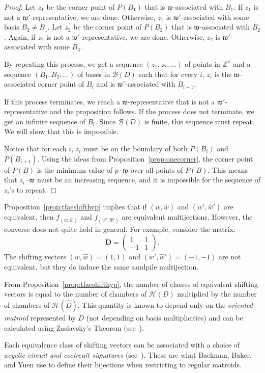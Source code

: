 \documentclass[ALCO,ThmDefs,Unicode,epreuves]{cedram}
\newcommand{\Z}{\mathbb{Z}}
\newcommand{\D}{\mathbf{D}}
\newcommand{\B}{\mathcal{B}}
\newcommand{\w}{\mathfrak w}
\begin{document}
\begin{proof}
Let $z_1$ be the corner point of $P(B_1)$ that is $\w$-associated with $B_1$. If $z_1$ is not a $\w'$-representative, we are done. Otherwise, $z_1$ is $\w'$-associated with some basis $B_2 \not= B_1$. Let $z_2$ be the corner point of $P(B_2)$ that is $\w$-associated with $B_2$. Again, if $z_2$ is not a $\w'$-representative, we are done. Otherwise, $z_2$ is $\w'$-associated with some $B_3$. 

By repeating this process, we get a sequence $(z_1,z_2,\dots)$ of points in $\Z^n$ and a sequence $(B_1,B_2,\dots)$ of bases in $\B(D)$ such that for every $i$, $z_i$ is the $\w$-associated corner point of $B_i$ and is $\w'$-associated with $B_{i+1}$. 

If this process terminates, we reach a $\w$-representative that is not a $\w'$-representative and the proposition follows. If the process does not terminate, we get an infinite sequence of $B_i$. Since $\B(D)$ is finite, this sequence must repeat. We will show that this is impossible.

Notice that for each $i$, $z_i$ must be on the boundary of both $P(B_i)$ and $P(B_{i+1})$. Using the ideas from Proposition~\ref{prop:onecorner}, the corner point of $P(B)$ is the minimum value of $p \cdot \w$ over all points of $P(B)$. This means that $z_i \cdot \w$ must be an increasing sequence, and it is impossible for the sequence of $z_i$'s to repeat. 
\end{proof}

Proposition~\ref{prop:tfaeshifthyp} implies that if $(w,\widehat w)$ and $(w',\widehat w')$ are equivalent, then $f_{(w,\widehat w)}$ and $f_{(w',\widehat{w}')}$ are equivalent multijections. However, the converse does not quite hold in general. For example, consider the matrix:
\[
\D = \begin{pmatrix} 1 & 1 \\ 
-1 & 1 \end{pmatrix}.
\]
The shifting vectors $(w,\widehat w) = (1,1)$ and $(w',\widehat w') = (-1,-1)$ are not equivalent, but they do induce the same sandpile multijection. 

From Proposition~\ref{prop:tfaeshifthyp}, the number of classes of equivalent shifting vectors is equal to the number of chambers of $\mathcal H(D)$ multiplied by the number of chambers of $\mathcal H(\widehat D)$. This quantity is known to depend only on the \emph{oriented matroid} represented by $D$ (not depending on basis multiplicities) and can be calculated using Zaslavsky's Theorem (see~\cite{Zaslavsky}). 
\begin{rema}
Each equivalence class of shifting vectors can be associated with a choice of \emph{acyclic circuit and cocircuit signatures} (see~\cite[Section~8.2]{mythesis}). These are what Backman, Baker, and Yuen use to define their bijections when restricting to regular matroids. 
\end{rema}
\end{document}

